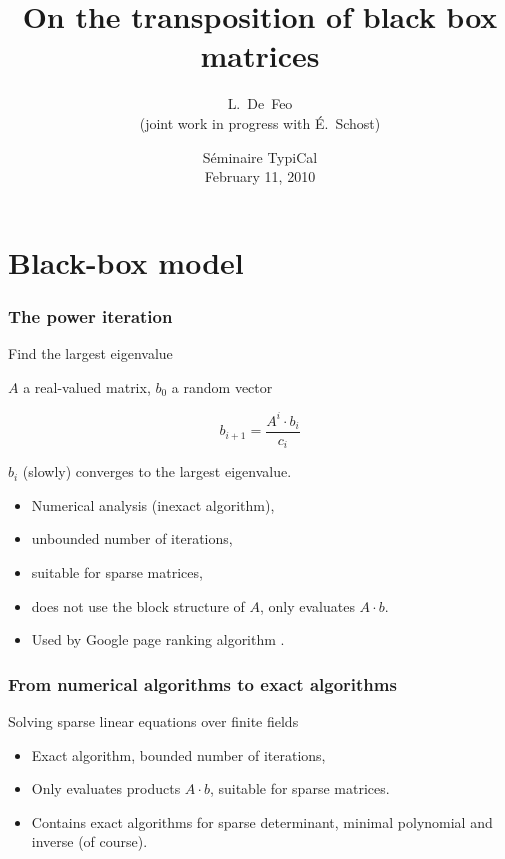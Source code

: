 \documentclass[10pt]{beamer}
\title{On the transposition of black box matrices}
\author[L. De Feo]{L.~De~Feo\\{\footnotesize(joint work in progress with É.~Schost)}}
\institute[TANC, LIX]{Projet TANC, LIX, École Polytechnique}
\date[Typical, February 11, 2010]{Séminaire TypiCal\\February 11, 2010}
\begin{document}
\begin{frame}
  \titlepage
\end{frame}

\section{Black-box model}

\begin{frame}
  \frametitle{The power iteration}

  \begin{block}{Find the largest eigenvalue}
    \begin{center}
      $A$ a real-valued matrix, $b_0$ a random vector

      \[b_{i+1} = \frac{A^i \cdot b_i}{c_i}\]
      
      $b_i$ (slowly) converges to the largest eigenvalue.
    \end{center}
  \end{block}

  \begin{itemize}
  \item Numerical analysis (inexact algorithm),
  \item unbounded number of iterations,
  \item \alert{suitable for sparse matrices},
  \item \alert{does not use the block structure of $A$, only evaluates
      $A\cdot b$}.
  \item Used by Google page ranking algorithm \cite{google}.
  \end{itemize}
\end{frame}


\begin{frame}
  \frametitle{From numerical algorithms to exact algorithms}

  \begin{block}{Solving \alert{sparse} linear equations over finite
      fields \cite{Wie86}}
    \begin{itemize}
    \item \alert{Exact} algorithm, \alert{bounded} number of iterations,
    \item Only evaluates products $A\cdot b$, suitable for sparse
      matrices.
    \item Contains exact algorithms for sparse determinant, minimal
      polynomial and inverse (of course).
    \end{itemize}
  \end{block}
\end{frame}
\end{document}

